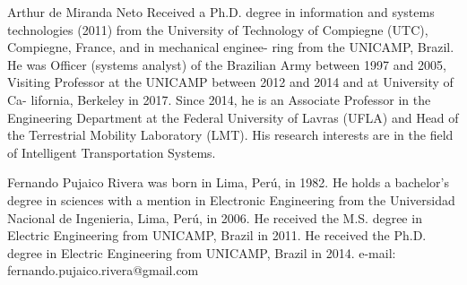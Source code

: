 \documentclass[letterpaper, 10 pt,conference]{ieeeconf}  %
\begin{document}
\begin{biography}{Arthur de Miranda Neto}
 Received a Ph.D. degree
in information and systems technologies (2011) from
the University of Technology of Compiegne (UTC),
Compiegne, France, and in mechanical enginee-
ring from the UNICAMP, Brazil. He was Officer
(systems analyst) of the Brazilian Army between
1997 and 2005, Visiting Professor at the UNICAMP
between 2012 and 2014 and at University of Ca-
lifornia, Berkeley in 2017. Since 2014, he is an
Associate Professor in the Engineering Department
at the Federal University of Lavras (UFLA) and
Head of the Terrestrial Mobility Laboratory (LMT). His research interests
are in the field of Intelligent Transportation Systems.
\end{biography}



\begin{biography}{Fernando Pujaico Rivera}
was born in Lima, Perú, in 1982. 
He holds a
bachelor’s degree in sciences with a mention in Electronic Engineering from the
Universidad Nacional de Ingenieria, Lima, Perú, in 2006. 
He received the M.S. degree in Electric Engineering from UNICAMP, Brazil in 2011. 
He received the Ph.D. degree in Electric Engineering from UNICAMP, Brazil in 2014. 
e-mail: fernando.pujaico.rivera@gmail.com
\end{biography}
\end{document}
